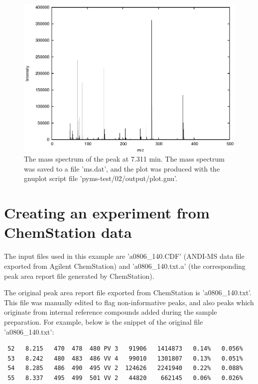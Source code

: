 \begin{figure}[htp]
\begin{center}
\includegraphics{graphics/pyms-test/ms.eps}
\caption{The mass spectrum of the peak at 7.311 min. The mass spectrum was
saved to a file 'ms.dat', and the plot was produced with the gnuplot script
file 'pyms-test/02/output/plot.gnu'.}
\label{fig:mass-spectrum}
\end{center}
\end{figure}

\section{Creating an experiment from ChemStation data}


The input files used in this example are 'a0806\_140.CDF' (ANDI-MS data
file exported from Agilent ChemStation) and 'a0806\_140.txt.a' (the
corresponding peak area report file generated by ChemStation).

The original peak area report file exported from ChemStation is
'a0806\_140.txt'. This file was manually edited to flag non-informative
peaks, and also peaks which originate from internal reference compounds
added during the sample preparation. For example, below is the snippet
of the original file 'a0806\_140.txt':

\begin{verbatim}
 52   8.215   470  478  480 PV 3   91906   1414873   0.14%   0.056%
 53   8.242   480  483  486 VV 4   99010   1301807   0.13%   0.051%
 54   8.285   486  490  495 VV 2  124626   2241940   0.22%   0.088%
 55   8.337   495  499  501 VV 2   44820    662145   0.06%   0.026%
\end{verbatim}


